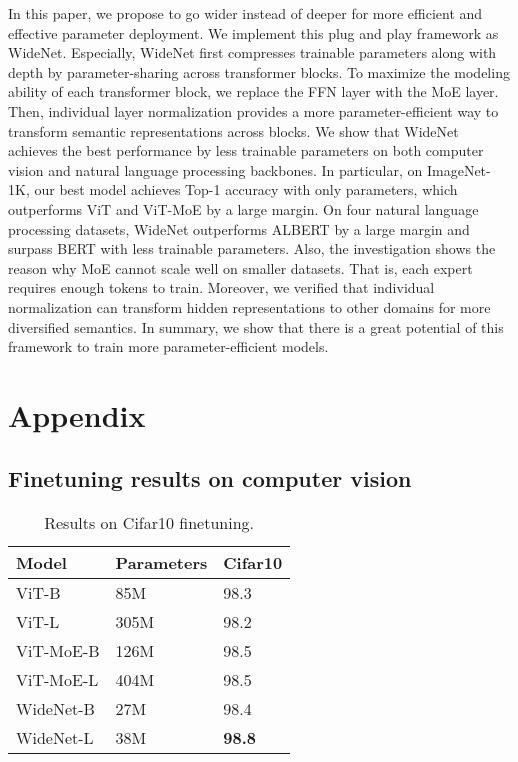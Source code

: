 \documentclass[letterpaper]{article} \usepackage{aaai22}  \usepackage{times}  \usepackage{helvet}  \usepackage{courier}  \usepackage[hyphens]{url}  \usepackage{graphicx} \urlstyle{rm} \def\UrlFont{\rm}  \usepackage{natbib}  \usepackage{caption} \DeclareCaptionStyle{ruled}{labelfont=normalfont,labelsep=colon,strut=off} \frenchspacing  \setlength{\pdfpagewidth}{8.5in}  \setlength{\pdfpageheight}{11in}  \usepackage{algorithm}
\begin{document}
In this paper, we propose to go wider instead of deeper for more efficient and effective parameter deployment. We implement this plug and play framework as WideNet. Especially, WideNet first compresses trainable parameters along with depth by parameter-sharing across transformer blocks. To maximize the modeling ability of each transformer block, we replace the FFN layer with the MoE layer. Then, individual layer normalization provides a more parameter-efficient way to transform semantic representations across blocks. We show that WideNet achieves the best performance by less trainable parameters on both computer vision and natural language processing backbones. In particular, on ImageNet-1K, our best model achieves  Top-1 accuracy with only  parameters, which outperforms ViT and ViT-MoE by a large margin. On four natural language processing datasets, WideNet outperforms ALBERT by a large margin and surpass BERT with less trainable parameters. Also, the investigation shows the reason why MoE cannot scale well on smaller datasets. That is, each expert requires enough tokens to train. Moreover, we verified that individual normalization can transform hidden representations to other domains for more diversified semantics. In summary, we show that there is a great potential of this framework to train more parameter-efficient models. 




\clearpage

\appendix
\section{Appendix}
\label{appendix}


\subsection{Finetuning results on computer vision}\label{appendix:cv-finetune}


\begin{table}[ht]
\centering
\caption{Results on Cifar10 finetuning.}
\label{tbl-main-finetune-Cifar10}
\begin{tabular}{l|l l}
\toprule
Model     & Parameters   & Cifar10\\ \midrule
ViT-B               & 85M       &  98.3      \\
ViT-L              & 305M         &   98.2    \\ \midrule
ViT-MoE-B           & 126M          &  98.5   \\
ViT-MoE-L           & 404M        &   98.5  \\ \midrule
WideNet-B         & 27M        &     98.4    \\
WideNet-L          & 38M     &       \textbf{98.8}    \\
\bottomrule
\end{tabular}
\end{table}
\end{document}
